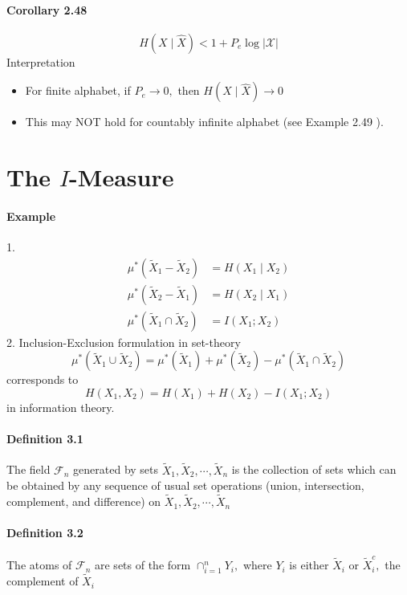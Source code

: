 \documentclass[8pt]{article}
\begin{document}
\paragraph{Corollary 2.48} $$H(X \mid \hat{X})<1+P_{e} \log |\mathcal{X}|$$
Interpretation
\begin{itemize}
	\item For finite alphabet, if $P_{e} \rightarrow 0,$ then $H(X \mid \hat{X}) \rightarrow 0$
	\item This may NOT hold for countably infinite alphabet (see Example 2.49 ).
\end{itemize}

\section{The $I$-Measure}
\paragraph{Example}
1.$$
\begin{aligned}
\mu^{*}\left(\tilde{X}_{1}-\tilde{X}_{2}\right) &=H\left(X_{1} \mid X_{2}\right) \\
\mu^{*}\left(\tilde{X}_{2}-\tilde{X}_{1}\right) &=H\left(X_{2} \mid X_{1}\right) \\
\mu^{*}\left(\tilde{X}_{1} \cap \tilde{X}_{2}\right) &=I\left(X_{1} ; X_{2}\right)
\end{aligned}
$$
2. Inclusion-Exclusion formulation in set-theory
$$
\mu^{*}\left(\tilde{X}_{1} \cup \tilde{X}_{2}\right)=\mu^{*}\left(\tilde{X}_{1}\right)+\mu^{*}\left(\tilde{X}_{2}\right)-\mu^{*}\left(\tilde{X}_{1} \cap \tilde{X}_{2}\right)
$$
corresponds to
$$
H\left(X_{1}, X_{2}\right)=H\left(X_{1}\right)+H\left(X_{2}\right)-I\left(X_{1} ; X_{2}\right)
$$
in information theory.

\paragraph{Definition 3.1} The field $\mathcal{F}_{n}$ generated by sets $\tilde{X}_{1}, \tilde{X}_{2}, \cdots, \tilde{X}_{n}$ is the collection of sets which can be obtained by any sequence of usual set operations (union, intersection, complement, and difference) on $\tilde{X}_{1}, \tilde{X}_{2}, \cdots, \tilde{X}_{n}$

\paragraph{Definition 3.2} The atoms of $\mathcal{F}_{n}$ are sets of the form $\cap_{i=1}^{n} Y_{i},$ where $Y_{i}$ is either $\tilde{X}_{i}$ or $\tilde{X}_{i}^{c},$ the complement of $\tilde{X}_{i}$
\end{document}
